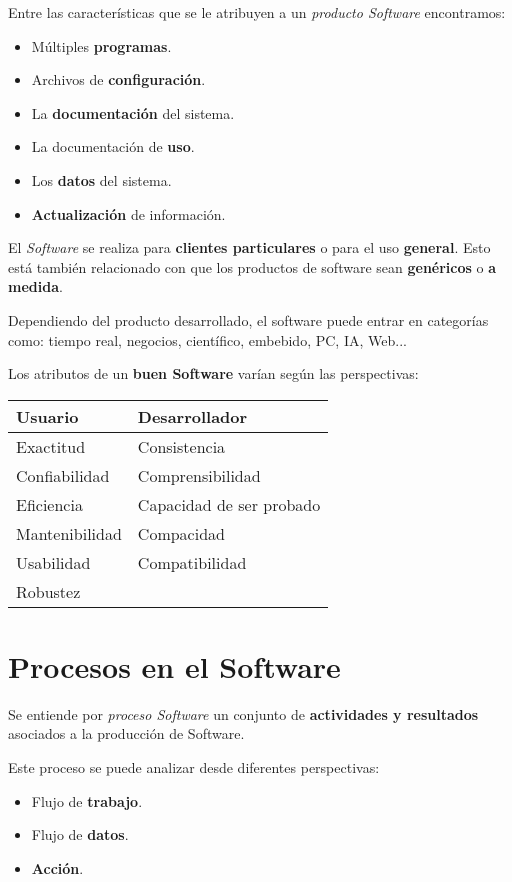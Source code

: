 Entre las características que se le atribuyen a un \emph{producto
  Software} encontramos:
\begin{itemize}[noitemsep]
\item Múltiples \textbf{programas}.
\item Archivos de \textbf{configuración}.
\item La \textbf{documentación} del sistema.
\item La documentación de \textbf{uso}.
\item Los \textbf{datos} del sistema.
\item \textbf{Actualización} de información.
\end{itemize}

El \textit{Software} se realiza para \textbf{clientes particulares} o
para el uso \textbf{general}. Esto está también relacionado con que
los productos de software sean \textbf{genéricos} o \textbf{a medida}.

Dependiendo del producto desarrollado, el software puede entrar en
categorías como: tiempo real, negocios, científico, embebido, PC, IA,
Web...

Los atributos de un \textbf{buen Software} varían según las perspectivas:
\begin{center}
\begin{tabular}[h]{p{5cm} | p{5cm}}
  \textbf{Usuario} & \textbf{Desarrollador} \\ \hline
  Exactitud & Consistencia \\
  Confiabilidad & Comprensibilidad \\
  Eficiencia & Capacidad de ser probado \\
  Mantenibilidad & Compacidad \\
  Usabilidad & Compatibilidad \\
  Robustez &
\end{tabular}
\end{center}

\section{Procesos en el Software}
\label{sec:procesos}

Se entiende por \emph{proceso Software} un conjunto de \textbf{actividades y
  resultados} asociados a la producción de Software.

Este proceso se puede analizar desde diferentes perspectivas:
\begin{itemize}[noitemsep]
\item Flujo de \textbf{trabajo}.
\item Flujo de \textbf{datos}.
\item \textbf{Acción}.
\end{itemize}

